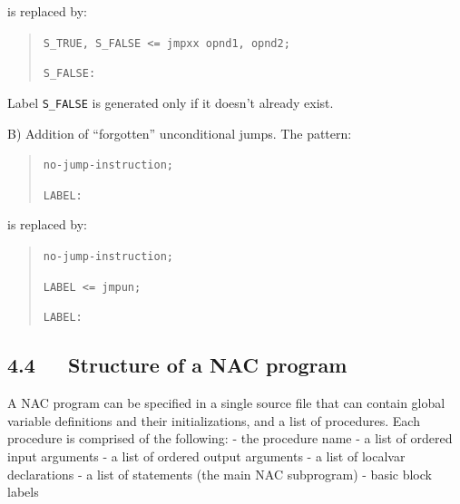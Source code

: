 \documentclass[a4paper]{article}
\newenvironment{DUlineblock}[1]{%
    \list{}{\setlength{\partopsep}{\parskip}
            \addtolength{\partopsep}{\baselineskip}
            \setlength{\topsep}{0pt}
            \setlength{\itemsep}{0.15\baselineskip}
            \setlength{\parsep}{0pt}
            \setlength{\leftmargin}{#1}}
    \raggedright
  }
  {\endlist}
\begin{document}
is replaced by:
%
\begin{quote}

\begin{DUlineblock}{0em}
\item[] \texttt{S\_TRUE, S\_FALSE <= jmpxx opnd1, opnd2;}
\item[] \texttt{S\_FALSE:}
\end{DUlineblock}

\end{quote}

Label \texttt{S\_FALSE} is generated only if it doesn't already exist.

B) Addition of ``forgotten'' unconditional jumps. The pattern:
%
\begin{quote}

\begin{DUlineblock}{0em}
\item[]
\begin{DUlineblock}{\DUlineblockindent}
\item[] \texttt{no-jump-instruction;}
\end{DUlineblock}
\item[] \texttt{LABEL:}
\end{DUlineblock}

\end{quote}

is replaced by:
%
\begin{quote}

\begin{DUlineblock}{0em}
\item[]
\begin{DUlineblock}{\DUlineblockindent}
\item[] \texttt{no-jump-instruction;}
\item[] \texttt{LABEL <= jmpun;}
\end{DUlineblock}
\item[] \texttt{LABEL:}
\end{DUlineblock}

\end{quote}


\subsection{4.4~~~Structure of a NAC program%
  \label{structure-of-a-nac-program}%
}

A NAC program can be specified in a single source file that can contain
global variable definitions and their initializations, and a list of
procedures. Each procedure is comprised of the following:
- the procedure name
- a list of ordered input arguments
- a list of ordered output arguments
- a list of localvar declarations
- a list of statements (the main NAC subprogram)
- basic block labels
\end{document}
